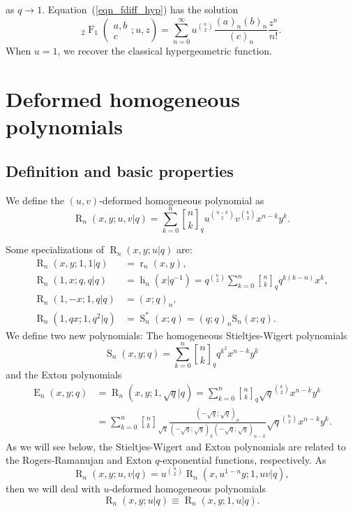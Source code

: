 \documentclass{cimart}
\newcommand{\qbinom}{\genfrac{[}{]}{0pt}{}}
\DeclareMathOperator{\opE}{E}
\DeclareMathOperator{\opF}{F}
\DeclareMathOperator{\oph}{h}
\DeclareMathOperator{\opR}{R}
\DeclareMathOperator{\opr}{r}
\DeclareMathOperator{\opS}{S}
\begin{document}
as $q\rightarrow1$. 
Equation~(\ref{eqn_fdiff_hyp}) has the solution
\begin{equation}
    {}_{2}\opF_{1}\left(
    \begin{array}{c}
         a,b \\
         c
    \end{array}
    ;u,z    
    \right)=\sum_{n=0}^{\infty}u^{\binom{n}{2}}\frac{(a)_{n}(b)_{n}}{(c)_{n}}\frac{z^{n}}{n!}.
\end{equation}
When $u=1$, we recover the classical hypergeometric function.

\section{Deformed homogeneous polynomials}

\subsection{Definition and basic properties}

\begin{definition}
We define the $(u,v)$-deformed homogeneous polynomial as
\begin{equation}
    \opR_{n}(x,y;u,v|q)=\sum_{k=0}^{n}\qbinom{n}{k}_{q}u^{\binom{n-k}{2}}v^{\binom{k}{2}}x^{n-k}y^{k}.
\end{equation}
\end{definition}
Some specializations of $\opR_{n}(x,y;u|q)$ are:
\begin{align}
    \opR_{n}(x,y;1,1|q)&=\opr_{n}(x,y),\label{eqn_poly1}\\
    \opR_{n}(1,x;q,q|q)&=\oph_{n}(x|q^{-1})=q^{\binom{n}{2}}\sum_{k=0}^{n}\qbinom{n}{k}_{q}q^{k(k-n)}x^k,\\
    \opR_{n}(1,-x;1,q|q)&=(x;q)_{n},\\
    \opR_{n}(1,qx;1,q^2|q)&=\opS^*_{n}(x;q)=(q;q)_{n}\mathrm{S}_{n}(x;q).
\end{align}
We define two new polynomials: The homogeneous Stieltjes-Wigert polynomials
\begin{equation}
    \opS_{n}(x,y;q)=\sum_{k=0}^{n}\qbinom{n}{k}_{q}q^{k^2}x^{n-k}y^{k}
\end{equation}
and the Exton polynomials 
\begin{align}
    \opE_{n}(x,y;q)&=\opR_{n}(x,y;1,\sqrt{q}|q)=\sum_{k=0}^{n}\qbinom{n}{k}_{q}\sqrt{q}^{\binom{k}{2}}x^{n-k}y^{k}\label{eqn_poly5}\\
    &=\sum_{k=0}^{n}\qbinom{n}{k}_{\sqrt{q}}\frac{(-\sqrt{q};\sqrt{q})_{n}}{(-\sqrt{q};\sqrt{q})_{k}(-\sqrt{q};\sqrt{q})_{n-k}}\sqrt{q}^{\binom{n}{2}}x^{n-k}y^{k}.
\end{align}
As we will see below, the Stieltjes-Wigert and Exton polynomials are related to the Rogers-Ramanujan and Exton $q$-exponential functions, respectively. As 
\begin{equation}
    \opR_{n}(x,y;u,v|q)=u^{\binom{n}{2}}\opR_{n}(x,u^{1-n}y;1,uv|q),
\end{equation}
then we will deal with $u$-deformed homogeneous polynomials
\begin{equation}\label{eqn_def_rs}
    \opR_{n}(x,y;u|q)\equiv\opR_{n}(x,y;1,u|q).
\end{equation}
\end{document}
